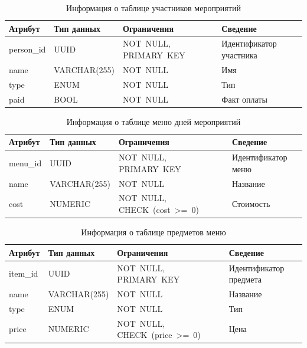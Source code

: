\begin{table}[h]
	\centering
	\caption{Информация о таблице участников мероприятий}
	\begin{tabularx}{\textwidth}{|p{2.6cm}|X|p{6cm}|X|}
		\hline
		\textbf{Атрибут} & \textbf{Тип данных} & \textbf{Ограничения} & \textbf{Сведение} \\
		\hline
		person\_id & UUID & NOT~NULL, \newline PRIMARY~KEY & Идентификатор участника \\
		\hline
		name & VARCHAR(255) & NOT~NULL & Имя \\
		\hline
		type & ENUM & NOT~NULL & Тип \\
		\hline
		paid & BOOL & NOT~NULL & Факт оплаты \\
		\hline
	\end{tabularx}
	\label{tbl:persons}
\end{table}

\begin{table}[h]
	\centering
	\caption{Информация о таблице меню дней мероприятий}
	\begin{tabularx}{\textwidth}{|p{2.6cm}|X|p{6cm}|X|}
		\hline
		\textbf{Атрибут} & \textbf{Тип данных} & \textbf{Ограничения} & \textbf{Сведение} \\
		\hline
		menu\_id & UUID & NOT~NULL, \newline PRIMARY~KEY & Идентификатор меню \\
		\hline
		name & VARCHAR(255) & NOT~NULL & Название \\
		\hline
		cost & NUMERIC & NOT~NULL, \newline CHECK~(cost~>=~0) & Стоимость \\
		\hline
	\end{tabularx}
	\label{tbl:menu}
\end{table}

\begin{table}[h]
	\centering
	\caption{Информация о таблице предметов меню}
	\begin{tabularx}{\textwidth}{|p{2.6cm}|X|p{6cm}|X|}
		\hline
		\textbf{Атрибут} & \textbf{Тип данных} & \textbf{Ограничения} & \textbf{Сведение} \\
		\hline
		item\_id & UUID & NOT~NULL, \newline PRIMARY~KEY & Идентификатор предмета \\
		\hline
		name & VARCHAR(255) & NOT~NULL & Название \\
		\hline
		type & ENUM & NOT~NULL & Тип \\
		\hline
		price & NUMERIC & NOT~NULL, \newline CHECK~(price~>=~0) & Цена \\
		\hline
	\end{tabularx}
	\label{tbl:items}
\end{table}

